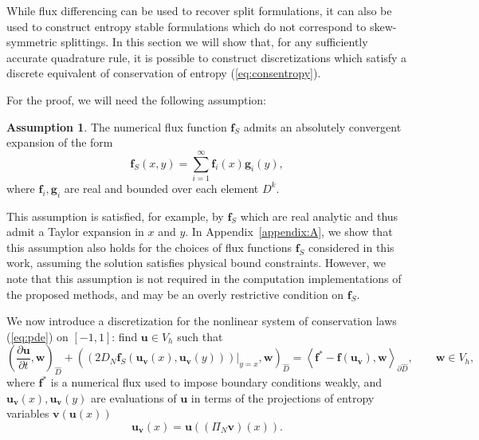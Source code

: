 \documentclass[preprint,10pt]{article}
\theoremstyle{definition}
\theoremstyle{lemma}
\theoremstyle{theorem}
\theoremstyle{assumption}
\newtheorem{assumption}{Assumption}
\newcommand{\pd}[2]{\frac{\partial#1}{\partial#2}}
\newcommand{\LRp}[1]{\left( #1 \right)}
\newcommand{\LRa}[1]{\left\langle #1 \right\rangle}
\begin{document}
While flux differencing can be used to recover split formulations, it can also be used to construct entropy stable formulations which do not correspond to skew-symmetric splittings.  In this section we will show that, for any sufficiently accurate quadrature rule, it is possible to construct discretizations which satisfy a discrete equivalent of conservation of entropy (\ref{eq:consentropy}).  

For the proof, we will need the following assumption:
\begin{assumption}
The numerical flux function $\bm{f}_S$ admits an absolutely convergent expansion of the form 
\[
\bm{f}_S(x,y) = \sum_{i=1}^{\infty} \bm{f}_i(x) \bm{g}_i(y), 
\]
where $\bm{f}_i, \bm{g}_i$ are real and bounded over each element $D^k$.  
\label{eq:assumption}
\end{assumption}
This assumption is satisfied, for example, by $\bm{f}_S$ which are real analytic and thus admit a Taylor expansion in $x$ and $y$.  In Appendix~\ref{appendix:A}, we show that this assumption also holds for the choices of flux functions $\bm{f}_S$ considered in this work, assuming the solution satisfies physical bound constraints.  However, we note that this assumption is not required in the computation implementations of the proposed methods, and may be an overly restrictive condition on $\bm{f}_S$.  

We now introduce a discretization for the nonlinear system of conservation laws (\ref{eq:pde}) on $[-1,1]$: find $\bm{u}\in V_h$ such that
\begin{equation}
\LRp{\pd{\bm{u}}{t},\bm{w}}_{\widehat{D}} + \LRp{\left.\LRp{2D_N \bm{f}_S(\bm{u}_{\bm{v}}(x),\bm{u}_{\bm{v}}(y))}\right|_{y=x},\bm{w}}_{\widehat{D}}= \LRa{\bm{f}^*-\bm{f}(\bm{u}_{\bm{v}}),\bm{w}}_{\partial \widehat{D}}, \qquad \bm{w}\in V_h,
\label{eq:ecdg_oneelem}
\end{equation}
where $\bm{f}^*$ is a numerical flux used to impose boundary conditions weakly, and $\bm{u}_{\bm{v}}(x),\bm{u}_{\bm{v}}(y)$ are evaluations of $\bm{u}$ in terms of the projections of entropy variables $\bm{v}(\bm{u}(x))$ 
\begin{equation}
\bm{u}_{\bm{v}}(x) = \bm{u}\LRp{(\Pi_N\bm{v})(x)}.
\label{eq:projectedentropyvars}
\end{equation}
\end{document}
